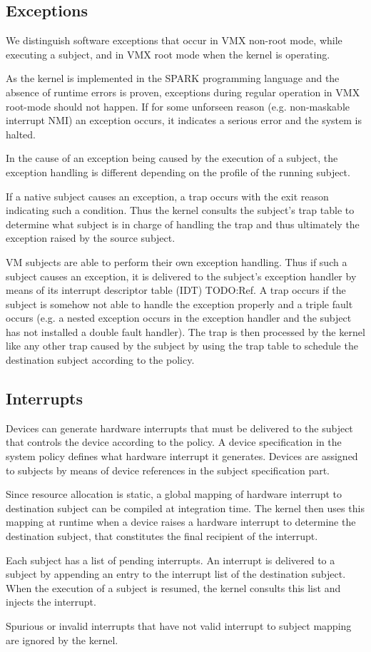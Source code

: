 \subsection{Exceptions}\label{subsec:design-exceptions}
We distinguish software exceptions that occur in VMX non-root mode, while
executing a subject, and in VMX root mode when the kernel is operating.

As the kernel is implemented in the SPARK programming language and the absence
of runtime errors is proven, exceptions during regular operation in VMX
root-mode should not happen. If for some unforseen reason (e.g. non-maskable
interrupt NMI) an exception occurs, it indicates a serious error and the system
is halted.

In the cause of an exception being caused by the execution of a subject, the
exception handling is different depending on the profile of the running subject.

If a native subject causes an exception, a trap occurs with the exit reason
indicating such a condition. Thus the kernel consults the subject's trap table
to determine what subject is in charge of handling the trap and thus ultimately
the exception raised by the source subject.

VM subjects are able to perform their own exception handling. Thus if such a
subject causes an exception, it is delivered to the subject's exception handler
by means of its interrupt descriptor table (IDT) TODO:Ref. A trap occurs if the
subject is somehow not able to handle the exception properly and a triple fault
occurs (e.g. a nested exception occurs in the exception handler and the subject
has not installed a double fault handler).
The trap is then processed by the kernel like any other trap caused by the
subject by using the trap table to schedule the destination subject according to
the policy.

\subsection{Interrupts}
Devices can generate hardware interrupts that must be delivered to the subject
that controls the device according to the policy. A device specification in the
system policy defines what hardware interrupt it generates. Devices are assigned
to subjects by means of device references in the subject specification part.

Since resource allocation is static, a global mapping of hardware interrupt to
destination subject can be compiled at integration time. The kernel then uses
this mapping at runtime when a device raises a hardware interrupt to determine
the destination subject, that constitutes the final recipient of the interrupt.

Each subject has a list of pending interrupts. An interrupt is delivered to a
subject by appending an entry to the interrupt list of the destination subject.
When the execution of a subject is resumed, the kernel consults this list and
injects the interrupt.

Spurious or invalid interrupts that have not valid interrupt to subject mapping
are ignored by the kernel.


